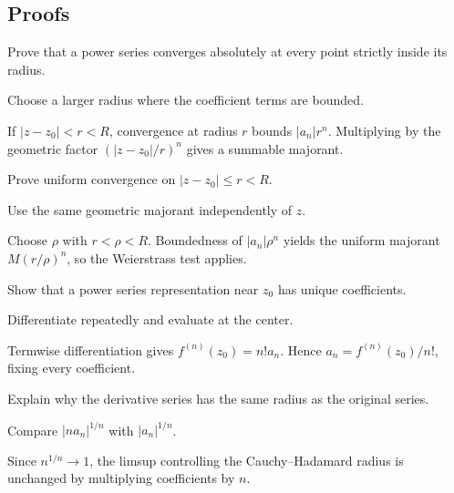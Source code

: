 \subsection*{Proofs}

\begin{exercise}\label{exr:iv03-expand-06}
Prove that a power series converges absolutely at every point strictly inside its radius.
\end{exercise}
\begin{hint}
Choose a larger radius where the coefficient terms are bounded.
\end{hint}
\begin{solution}
If \(|z-z_0|<r<R\), convergence at radius \(r\) bounds \(|a_n|r^n\). Multiplying by the geometric factor \((|z-z_0|/r)^n\) gives a summable majorant.
\end{solution}

\begin{exercise}\label{exr:iv03-expand-07}
Prove uniform convergence on \(|z-z_0|\le r<R\).
\end{exercise}
\begin{hint}
Use the same geometric majorant independently of \(z\).
\end{hint}
\begin{solution}
Choose \(\rho\) with \(r<\rho<R\). Boundedness of \(|a_n|\rho^n\) yields the uniform majorant \(M(r/\rho)^n\), so the Weierstrass test applies.
\end{solution}

\begin{exercise}\label{exr:iv03-expand-08}
Show that a power series representation near \(z_0\) has unique coefficients.
\end{exercise}
\begin{hint}
Differentiate repeatedly and evaluate at the center.
\end{hint}
\begin{solution}
Termwise differentiation gives \(f^{(n)}(z_0)=n!a_n\). Hence \(a_n=f^{(n)}(z_0)/n!\), fixing every coefficient.
\end{solution}

\begin{exercise}\label{exr:iv03-expand-09}
Explain why the derivative series has the same radius as the original series.
\end{exercise}
\begin{hint}
Compare \(|na_n|^{1/n}\) with \(|a_n|^{1/n}\).
\end{hint}
\begin{solution}
Since \(n^{1/n}\to1\), the limsup controlling the Cauchy--Hadamard radius is unchanged by multiplying coefficients by \(n\).
\end{solution}

